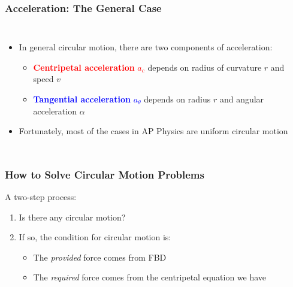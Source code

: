 \documentclass[12pt,compress,aspectratio=169]{beamer}
\newcommand{\mb}[1]{\ensuremath\mathbf{#1}}
\newcommand{\eq}[2]{\vspace{#1}{\Large\begin{displaymath}#2\end{displaymath}}}
\begin{document}
\begin{frame}
  \frametitle{Acceleration: The General Case}
  \begin{columns}
    
    \begin{itemize}
    \item In general circular motion, there are two components of acceleration:
      \begin{itemize}
      \item\textcolor{red}{\textbf{Centripetal acceleration} $a_c$} depends on
        radius of curvature $r$ and speed $v$
      \item \textcolor{blue}{\textbf{Tangential acceleration} $a_\theta$}
        depends on radius $r$  and angular acceleration $\alpha$
      \end{itemize}
    \item Fortunately, most of the cases in AP Physics are uniform circular
      motion
    \end{itemize}
  \end{columns}
\end{frame}


\begin{frame}
  \frametitle{How to Solve Circular Motion Problems}

  A two-step process:
  \begin{enumerate}
  \item Is there any circular motion?
  \item If so, the condition for circular motion is:

    \eq{-.2in}{
      \mb{F}_\mathrm{provided}=\mb{F}_\mathrm{required}
    }
    \begin{itemize}
    \item The \emph{provided} force comes from FBD
    \item The \emph{required} force comes from the centripetal equation we have
    \end{itemize}
  \end{enumerate}
\end{frame}
\end{document}
